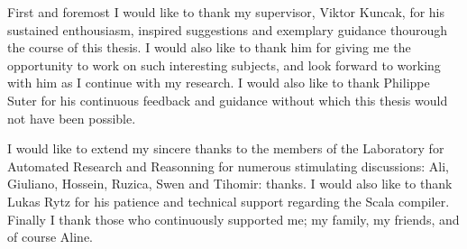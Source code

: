 First and foremost I would like to thank my supervisor, Viktor Kuncak, for his
sustained enthousiasm, inspired suggestions and exemplary guidance thourough
the course of this thesis. I would also like to thank him for giving me the
opportunity to work on such interesting subjects, and look forward to working
with him as I continue with my research. I would also like to thank Philippe
Suter for his continuous feedback and guidance without which this thesis would
not have been possible.

I would like to extend my sincere thanks to the members of the Laboratory for
Automated Research and Reasonning for numerous stimulating discussions: Ali,
Giuliano, Hossein, Ruzica, Swen and Tihomir: thanks. I would also like to thank
Lukas Rytz for his patience and technical support regarding the Scala compiler.
Finally I thank those who continuously supported me; my family, my friends, and
of course Aline.
